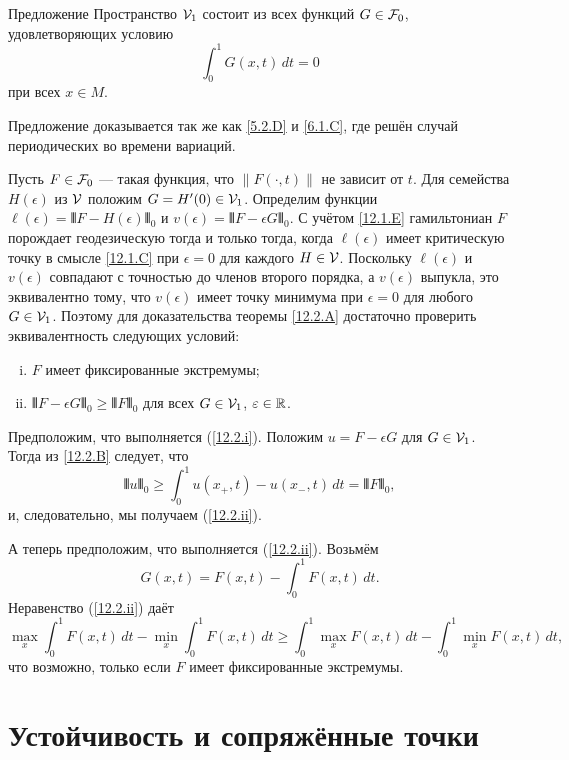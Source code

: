 \begin{thm}{Предложение}\label{12.2.B}
Пространство $\mathcal{V}_1$ состоит из всех функций $G\in\mathcal{F}_0$, удовлетворяющих условию
\[\int_0^1G(x,t)\,dt=0\]
при всех $x\in M$.
\end{thm}

Предложение доказывается так же как \ref{5.2.D} и \ref{6.1.C}, где решён случай периодических во времени вариаций.

Пусть $F\in\mathcal{F}_0$ — такая функция, что $\|F(\cdot, t)\|$ не зависит от $t$.
Для семейства $H(\epsilon)$ из $\mathcal{V}$ положим $G = H'(0)\in\mathcal{V}_1$.
Определим функции $\ell(\epsilon) = \VERT F - H(\epsilon)\VERT_0$ и $v(\epsilon) = \VERT F - \epsilon G\VERT_0$.
С учётом \ref{12.1.E} гамильтониан $F$ порождает геодезическую тогда и только тогда, когда $\ell(\epsilon)$ имеет критическую точку в смысле \ref{12.1.C} при $\epsilon= 0$ для каждого $H\in\mathcal{V}$.
Поскольку $\ell(\epsilon)$ и $v(\epsilon)$ совпадают с точностью до членов второго порядка, а $v(\epsilon)$ выпукла, это эквивалентно тому, что $v(\epsilon)$ имеет точку минимума при $\epsilon= 0$ для любого $G\in\mathcal{V}_1$.
Поэтому для доказательства теоремы \ref{12.2.A} достаточно проверить эквивалентность следующих условий:
\begin{enumerate}[(i)]
\item\label{12.2.i} $F$ имеет фиксированные экстремумы;
\item\label{12.2.ii} $\VERT F - \epsilon G\VERT_0 \ge \VERT F\VERT_0$ для всех $G\in\mathcal{V}_1$, $\varepsilon\in\mathbb{R}$.
\end{enumerate} 

Предположим, что выполняется (\ref{12.2.i}).
Положим 
$u=F-\epsilon G$ для $G\in \mathcal{V}_1$.
Тогда из \ref{12.2.B} следует, что 
\[\VERT u\VERT_0 \ge \int_0^1 u(x_+,t)-u(x_-,t)\,dt=\VERT F\VERT_0,\]
и, следовательно, мы получаем (\ref{12.2.ii}).

А теперь предположим, что выполняется (\ref{12.2.ii}).
Возьмём 
\[G(x, t) = F(x, t) - \int_0^1F(x,t)\,dt.\]
Неравенство (\ref{12.2.ii}) даёт 
\[
\max_x\!\int_0^1 F(x, t)\,dt- \min_x\!\int_0^1 F(x, t)\,dt
\ge
\int_0^1 \max_xF(x, t)\,dt-\! \int_0^1\min_x F(x, t)\,dt,
\]
что возможно, только если $F$ имеет фиксированные экстремумы.
\qeds


\section{Устойчивость и сопряжённые точки}

